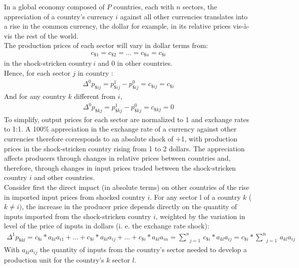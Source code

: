 \documentclass[11pt,a4paper]{article}
\begin{document}
In a global economy composed of $P$ countries, each with $n$ sectors, the appreciation of a country's currency $i$ against all other currencies translates into a rise in the common currency, the dollar for example, in its relative prices vis-\`a-vis the rest of the world. \\ 
The production prices of each sector will vary in dollar terms from:
\begin{eqnarray*}
c_{\$1}=c_{\$2}=\ldots=c_{\$n}=c_{\$i} 
  \end{eqnarray*}	
in the shock-stricken country$~i$ and 0 in other countries. \\
Hence, for each sector $j$ in country  :
\begin{eqnarray*}
 {{\Delta }^{0}}p_{\${ij}}=p_{\${ij}}^{1}-p_{\${ij}}^{0}=c_{\${ij}}=c_{\${i}}
  \end{eqnarray*}	
And for any country $k$ different from $i$,
\begin{eqnarray*}
 {{\Delta }^{0}}p_{\${kj}}=p_{\${kj}}^{1}-p_{\${kj}}^{0}=c_{\${kj}}=0
 \end{eqnarray*}	
To simplify, output prices for each sector are normalized to 1 and exchange rates to 1:1. A 100$\%$ appreciation in the exchange rate of a currency against other currencies therefore corresponds to an absolute shock of +1, with production prices in the shock-stricken country rising from 1 to 2 dollars. The appreciation affects producers through changes in relative prices between countries and, therefore, through changes in input prices traded between the shock-stricken country $i$ and other countries. \\
Consider first the direct impact (in absolute terms) on other countries of the rise in imported input prices from shocked country $i$. For any sector l of a country $k$ ($k\ne i)$, the increase in the producer price depends directly on the quantity of inputs imported from the shock-stricken country $i$, weighted by the variation in level of the price of inputs in dollars (i. e. the exchange rate shock):\\
\begin{eqnarray}
\Delta ^1 p_{\${kl}}=c_{\${i}}*a_{kl}a_{i1}+\ldots+c_{\${i}}*a_{kl}a_{ij}+\ldots+c_{\$i}*a_{kl}a_{in}=\underset{j=1}{\overset{n}{\mathop\sum}}\,{c}_{\$i}*a_{kl}a_{ij}=c_{\$i}*\underset{j=1}{\overset{\text{n}}{\mathop\sum}}\,a_{kl}a_{ij}  
\label{eq:eq1} 
\end{eqnarray}
With $a_{kl}a_{ij}$ the quantity of inputs from the country's sector needed to develop a production unit for the country's $k$ sector $l$. \\
\end{document}
